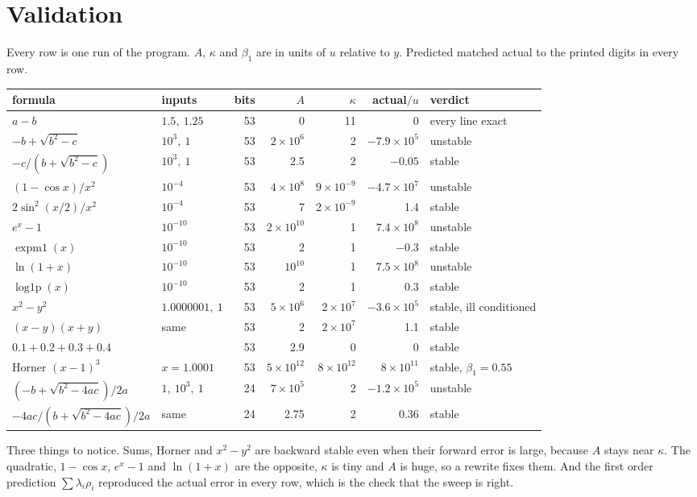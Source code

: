 \documentclass[11pt]{article}
\newcommand{\lam}{\lambda}
\begin{document}
\section{Validation}
Every row is one run of the program. $A$, $\kappa$ and $\beta_1$ are in units of $u$ relative to $y$. Predicted matched actual to the printed digits in every row.
\begin{center}
\small
\begin{tabular}{@{}llrrrrl@{}}
\toprule
formula & inputs & bits & $A$ & $\kappa$ & actual$/u$ & verdict \\
\midrule
$a - b$ & $1.5,\ 1.25$ & 53 & 0 & 11 & 0 & every line exact \\
$-b+\sqrt{b^2-c}$ & $10^3,\ 1$ & 53 & $2\times10^{6}$ & 2 & $-7.9\times10^{5}$ & unstable \\
$-c/(b+\sqrt{b^2-c})$ & $10^3,\ 1$ & 53 & 2.5 & 2 & $-0.05$ & stable \\
$(1-\cos x)/x^2$ & $10^{-4}$ & 53 & $4\times10^{8}$ & $9\times10^{-9}$ & $-4.7\times10^{7}$ & unstable \\
$2\sin^2(x/2)/x^2$ & $10^{-4}$ & 53 & 7 & $2\times10^{-9}$ & 1.4 & stable \\
$e^{x}-1$ & $10^{-10}$ & 53 & $2\times10^{10}$ & 1 & $7.4\times10^{8}$ & unstable \\
$\operatorname{expm1}(x)$ & $10^{-10}$ & 53 & 2 & 1 & $-0.3$ & stable \\
$\ln(1+x)$ & $10^{-10}$ & 53 & $10^{10}$ & 1 & $7.5\times10^{8}$ & unstable \\
$\operatorname{log1p}(x)$ & $10^{-10}$ & 53 & 2 & 1 & 0.3 & stable \\
$x^2-y^2$ & $1.0000001,\ 1$ & 53 & $5\times10^{6}$ & $2\times10^{7}$ & $-3.6\times10^{5}$ & stable, ill conditioned \\
$(x-y)(x+y)$ & same & 53 & 2 & $2\times10^{7}$ & 1.1 & stable \\
$0.1+0.2+0.3+0.4$ & & 53 & 2.9 & 0 & 0 & stable \\
Horner $(x-1)^3$ & $x = 1.0001$ & 53 & $5\times10^{12}$ & $8\times10^{12}$ & $8\times10^{11}$ & stable, $\beta_1 = 0.55$ \\
$(-b+\sqrt{b^2-4ac})/2a$ & $1,\ 10^3,\ 1$ & 24 & $7\times10^{5}$ & 2 & $-1.2\times10^{5}$ & unstable \\
$-4ac/(b+\sqrt{b^2-4ac})/2a$ & same & 24 & 2.75 & 2 & 0.36 & stable \\
\bottomrule
\end{tabular}
\end{center}
Three things to notice. Sums, Horner and $x^2 - y^2$ are backward stable even when their forward error is large, because $A$ stays near $\kappa$. The quadratic, $1-\cos x$, $e^x - 1$ and $\ln(1+x)$ are the opposite, $\kappa$ is tiny and $A$ is huge, so a rewrite fixes them. And the first order prediction $\sum \lam_i\rho_i$ reproduced the actual error in every row, which is the check that the sweep is right.
\end{document}
